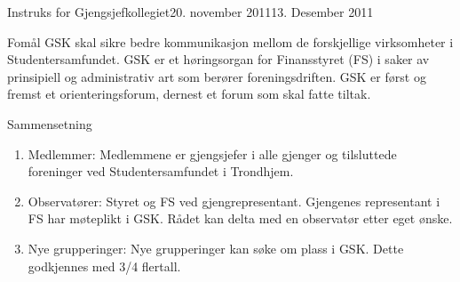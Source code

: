 
\begin{instruks}{Instruks for Gjengsjefkollegiet}{20. november 2011}{13. Desember 2011}

    \begin{instruksledd}{Fomål}
        GSK skal sikre bedre kommunikasjon mellom de forskjellige virksomheter i
        Studentersamfundet.
        GSK er et høringsorgan for Finansstyret (FS) i saker av prinsipiell og
        administrativ art som berører
        foreningsdriften. GSK er først og fremst et orienteringsforum, dernest et forum
        som skal fatte tiltak.
    \end{instruksledd}

    \begin{instruksledd}{Sammensetning}
        \begin{enumerate}
            \item Medlemmer:
                Medlemmene er gjengsjefer i alle gjenger og tilsluttede foreninger ved
                Studentersamfundet i Trondhjem.
            \item Observatører:
                Styret og FS ved gjengrepresentant. Gjengenes representant i FS har møteplikt i
                GSK. Rådet kan delta med
                en observatør etter eget ønske.
            \item Nye grupperinger:
                Nye grupperinger kan søke om plass i GSK. Dette godkjennes med 3/4 flertall.
        \end{enumerate}
    \end{instruksledd}


\end{instruks}
